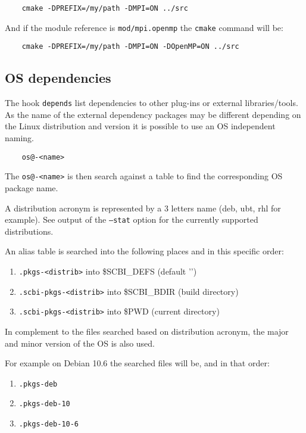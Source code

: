 \documentclass[a4paper,12pt,twoside]{article}
\newcommand{\code}[1]{\texttt{#1}}
\newcommand{\file}[1]{'{\path{#1}}'}
\begin{document}
\begin{lstlisting}
	cmake -DPREFIX=/my/path -DMPI=ON ../src
\end{lstlisting}

And if the module reference is \code{mod/mpi.openmp} the \code{cmake} command will be:

\begin{lstlisting}
	cmake -DPREFIX=/my/path -DMPI=ON -DOpenMP=ON ../src
\end{lstlisting}

\subsection{OS dependencies}
\label{OS dependencies}

The hook \code{depends} list dependencies to other plug-ins or external libraries/tools. As the name of the external dependency packages may be different depending on the Linux distribution and version it is possible to use an OS independent naming.

\begin{lstlisting}
	os@-<name>
\end{lstlisting}

The \code{os@-<name>} is then search against a table to find the corresponding OS package name.

A distribution acronym is represented by a 3 letters name (deb, ubt, rhl for example). See output of the \code{--stat} option for the currently supported distributions.

An alias table is searched into the following places and in this specific order:

\begin{enumerate}
	\item \code{.pkgs-<distrib>} into \$SCBI\_DEFS (default \file{~/.config/scbi})
	\item \code{.scbi-pkgs-<distrib>} into \$SCBI\_BDIR (build directory)
	\item \code{.scbi-pkgs-<distrib>} into \$PWD (current directory)
\end{enumerate}

In complement to the files searched based on distribution acronym, the major and minor version of the OS is also used.

For example on Debian 10.6 the searched files will be, and in that order:

\begin{enumerate}
	\item \code{.pkgs-deb}
	\item \code{.pkgs-deb-10}
	\item \code{.pkgs-deb-10-6}
\end{enumerate}
\end{document}

